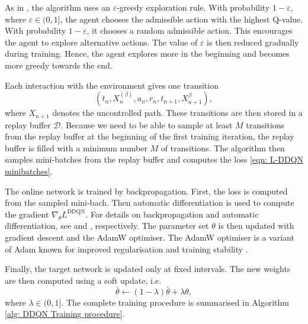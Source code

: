 As in \cite{anchuri2026rammstein}, the algorithm uses an $\varepsilon$-greedy exploration rule. With probability $1-\varepsilon$, where $\varepsilon \in (0,1]$, the agent chooses the admissible action with the highest Q-value. With probability $1-\varepsilon$, it chooses a random admissible action. This encourages the agent to explore alternative actions. The value of $\varepsilon$ is then reduced gradually during training. Hence, the agent explores more in the beginning and becomes more greedy towards the end.

Each interaction with the environment gives one transition
\begin{equation*}
    (t_n, X^{(\beta)}_n,a_n,r_n,t_{n+1},X^{\beta}_{n+1}),
\end{equation*}
where $X_{n+1}$ denotes the uncontrolled path. These transitions are then stored in a replay buffer $\mathcal{D}$. Because we need to be able to sample at least $M$ transitions from the replay buffer at the beginning of the first training iteration, the replay buffer is filled with a minimum number $M$ of transitions. The algorithm then samples mini-batches from the replay buffer and computes the loss \eqref{eqn: L-DDQN minibatches}. 

The online network is trained by backpropagation. First, the loss is computed from the sampled mini-bach. Then automatic differentiation is used to compute the gradient $\nabla_\theta L^{\text{DDQN}}$. For details on backpropagation and automatic differentiation, see \cite{damadi2023backpropagation} and \cite{baydin2018automatic}, respectively. The parameter set $\theta$ is then updated with gradient descent and the AdamW optimiser. The AdamW optimiser is a variant of Adam known for improved regularisation and training stability \cite{loshchilov2017decoupled}.

Finally, the target network is updated only at fixed intervals. The new weights are then computed using a soft update, i.e.
\begin{equation*}
    \bar \theta \gets (1-\lambda) \bar \theta + \lambda \theta,
\end{equation*}
where $\lambda \in (0,1]$. The complete training procedure is summarised in Algorithm \ref{alg: DDQN Training procedure}.

